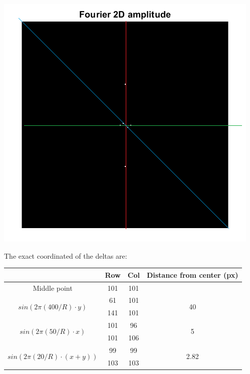 \documentclass[a4paper]{iacas}
\begin{document}
\vskip 0.1in
\begin{minipage}{0.5\textwidth}
\centering
	\includegraphics[scale=1]{imgs/q1_2_colored.png}
\end{minipage}
\vskip 0.1in

The exact coordinated of the deltas are:

\begin{table}[]
\begin{tabular}{|c|c|c|c|}
\hline
                            & Row & Col & Distance from center (px) \\ \hline
Middle point                & 101 & 101 &                           \\ \hline
\multirow{2}{*}{ $sin(2\pi(400/R)\cdot y)$} & 61  & 101 & \multirow{2}{*}{40}       \\ \cline{2-3}
                            & 141 & 101 &                           \\ \hline
\multirow{2}{*}{$sin(2\pi(50/R)\cdot x)$}  & 101 & 96  & \multirow{2}{*}{5}        \\ \cline{2-3}
                            & 101 & 106 &                           \\ \hline
\multirow{2}{*}{$sin(2\pi(20/R)\cdot (x+y))$}  & 99  & 99  & \multirow{2}{*}{2.82}     \\ \cline{2-3}
                            & 103 & 103 &                           \\ \hline
\end{tabular}
\end{table}
\end{document}
